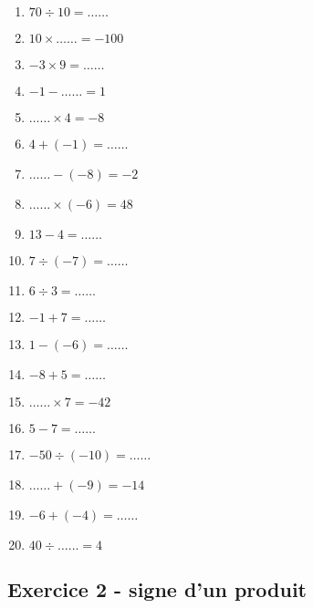 \documentclass[11pt]{article}
\begin{document}
\begin{multicols}{3}\noindent
    \begin{enumerate}
        \item $70 \div 10 = \ldots\ldots$
        \item $10 \times \ldots\ldots = -100$
        \item $-3 \times 9 = \ldots\ldots$
        \item $-1 - \ldots\ldots = 1$
        \item $\ldots\ldots \times 4 = -8$
        \item $4 + \left( -1\right) = \ldots\ldots$
        \item $\ldots\ldots - \left( -8\right) = -2$
        \item $\ldots\ldots \times \left( -6\right) = 48$
        \item $13 - 4 = \ldots\ldots$
        \item $7 \div \left( -7\right) = \ldots\ldots$
        \item $6 \div 3 = \ldots\ldots$
        \item $-1 + 7 = \ldots\ldots$
        \item $1 - \left( -6\right) = \ldots\ldots$
        \item $-8 + 5 = \ldots\ldots$
        \item $\ldots\ldots \times 7 = -42$
        \item $5 - 7 = \ldots\ldots$
        \item $-50 \div \left( -10\right) = \ldots\ldots$
        \item $\ldots\ldots + \left( -9\right) = -14$
        \item $-6 + \left( -4\right) = \ldots\ldots$
        \item $40 \div \ldots\ldots = 4$
    \end{enumerate}
  \end{multicols}

\subsection*{Exercice 2 - signe d'un produit}
\end{document}
